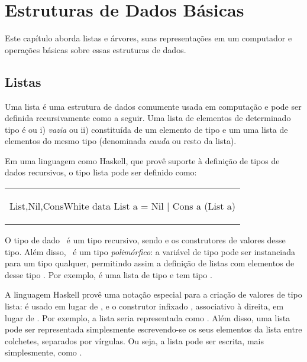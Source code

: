 \chapter{Estruturas de Dados Básicas}
\label{ch:estruturas-de-dados-basicas}

Este capítulo aborda listas e árvores, suas representações em um computador e
operações básicas sobre essas estruturas de dados.

\section{Listas}
\label{sec:listas}

Uma lista é uma estrutura de dados comumente usada em computação e
pode ser definida recursivamente como a seguir.  Uma lista de
elementos de determinado tipo  é ou i) {\em vazia} ou ii)
constituída de um elemento de tipo  e um uma lista de elementos
do mesmo tipo  (denominada {\em cauda} ou resto da lista).

Em uma linguagem como Haskell, que provê suporte à definição de tipos
de dados recursivos, o tipo lista pode ser definido como:

\begin{center}
\begin{tabular}{l}
\begin{hask}{List,Nil,Cons}{White}
data List a = Nil | Cons a (List a)
\end{hask}
\end{tabular}
\end{center}

O tipo de dado \ é um tipo recursivo, sendo  e
 os construtores de valores desse tipo. Além disso,
\ é um tipo {\em polimórfico}: a variável de tipo 
pode ser instanciada para um tipo  qualquer, permitindo assim a
definição de listas com elementos de desse tipo . Por exemplo,
 é uma lista de tipo  e  tem tipo .

A linguagem Haskell provê uma notação especial para a criação de
valores de tipo lista: \inh{[]} é usado em lugar de , e o
construtor infixado \inh{(:)}, associativo à direita, em lugar de
. Por exemplo, a lista 
seria representada como .  Além disso, uma lista pode
ser representada simplesmente escrevendo-se os seus elementos da lista
entre colchetes, separados por vírgulas. Ou seja, a lista
 pode ser escrita, mais simplesmente, como
\inh{[1,2,3]}.

